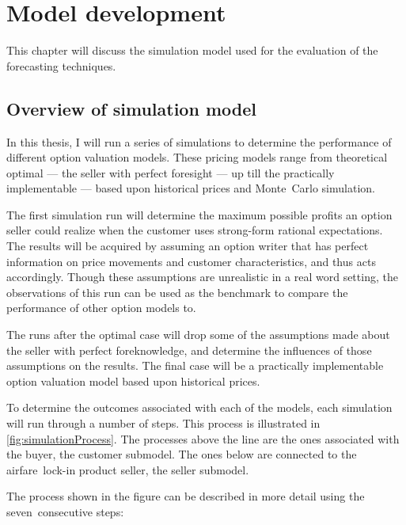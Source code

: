 \chapter{Model development}
\label{chap:ModelDevelopment}
This chapter will discuss the simulation model used for the evaluation of the forecasting techniques. 

\section{Overview of simulation model}
\label{sec:SimulationModel}
In this thesis, I will run a series of simulations to determine the performance of different option valuation models. These pricing models range from theoretical optimal --- the seller with perfect foresight --- up till the practically implementable --- based upon historical prices and Monte~Carlo simulation.

The first simulation run will determine the maximum possible profits an option seller could realize when the customer uses strong-form rational expectations. The results will be acquired by assuming an option writer that has perfect information on price movements and customer characteristics, and thus acts accordingly. Though these assumptions are unrealistic in a real word setting, the observations of this run can be used as the benchmark to compare the performance of other option models to.

The runs after the optimal case will drop some of the assumptions made about the seller with perfect foreknowledge, and determine the influences of those assumptions on the results. The final case will be a practically implementable option valuation model based upon historical prices.

To determine the outcomes associated with each of the models, each simulation will run through a number of steps. This process is illustrated in \autoref{fig:simulationProcess}. The processes above the line are the ones associated with the buyer, the customer submodel. The ones below are connected to the airfare~lock-in product seller, the seller submodel.


The process shown in the figure can be described in more detail using the seven~consecutive steps:

